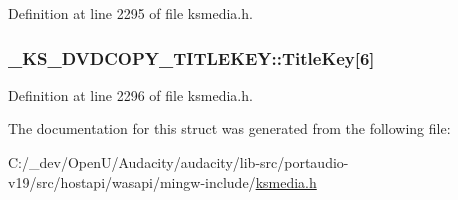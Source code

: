 Definition at line 2295 of file ksmedia.\+h.

\subsubsection[{\texorpdfstring{Title\+Key}{TitleKey}}]{ \+\_\+\+K\+S\+\_\+\+D\+V\+D\+C\+O\+P\+Y\+\_\+\+T\+I\+T\+L\+E\+K\+E\+Y\+::\+Title\+Key\mbox{[}6\mbox{]}}\hypertarget{struct___k_s___d_v_d_c_o_p_y___t_i_t_l_e_k_e_y_a8beb789335f9d42c9e8914de5ce4b9c0}{}\label{struct___k_s___d_v_d_c_o_p_y___t_i_t_l_e_k_e_y_a8beb789335f9d42c9e8914de5ce4b9c0}


Definition at line 2296 of file ksmedia.\+h.



The documentation for this struct was generated from the following file\+:\begin{DoxyCompactItemize}
\item 
C\+:/\+\_\+dev/\+Open\+U/\+Audacity/audacity/lib-\/src/portaudio-\/v19/src/hostapi/wasapi/mingw-\/include/\hyperlink{ksmedia_8h}{ksmedia.\+h}\end{DoxyCompactItemize}
